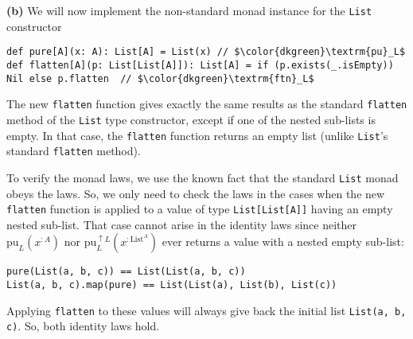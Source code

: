 \textbf{(b)} We will now implement the non-standard monad instance
for the \lstinline!List! constructor
\begin{lstlisting}[mathescape=true]
def pure[A](x: A): List[A] = List(x) // $\color{dkgreen}\textrm{pu}_L$
def flatten[A](p: List[List[A]]): List[A] = if (p.exists(_.isEmpty)) Nil else p.flatten  // $\color{dkgreen}\textrm{ftn}_L$
\end{lstlisting}
The new \lstinline!flatten! function gives exactly the same results
as the standard \lstinline!flatten! method of the \lstinline!List!
type constructor, except if one of the nested sub-lists is empty.
In that case, the \lstinline!flatten! function returns an empty list
(unlike \lstinline!List!\textsf{'}s standard \lstinline!flatten! method).

To verify the monad laws, we use the known fact that the standard
\lstinline!List! monad obeys the laws. So, we only need to check
the laws in the cases when the new \lstinline!flatten! function is
applied to a value of type \lstinline!List[List[A]]! having an empty
nested sub-list. That case cannot arise in the identity laws since
neither $\text{pu}_{L}(x^{:A})$ nor $\text{pu}_{L}^{\uparrow L}(x^{:\text{List}^{A}})$
ever returns a value with a nested empty sub-list:
\begin{lstlisting}
pure(List(a, b, c)) == List(List(a, b, c))
List(a, b, c).map(pure) == List(List(a), List(b), List(c))
\end{lstlisting}
Applying \lstinline!flatten! to these values will always give back
the initial list \lstinline!List(a, b, c)!. So, both identity laws
hold.

